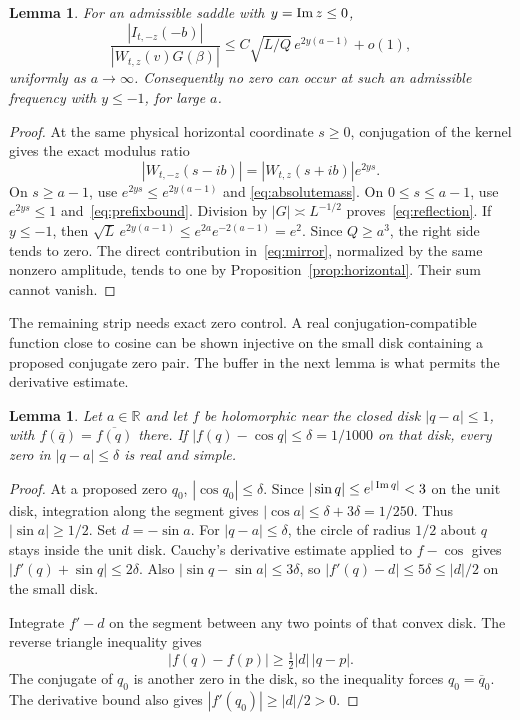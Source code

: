 \documentclass[11pt]{article}
\newtheorem{lemma}[theorem]{Lemma}
\theoremstyle{remark}\newtheorem{remark}[theorem]{Remark}
\newcommand{\R}{\mathbb R}\newcommand{\C}{\mathbb C}
\begin{document}
\begin{lemma}\label{lem:reflection}
For an admissible saddle with $y=\operatorname{Im} z\leq0$,
\begin{equation}\label{eq:reflection}
 \frac{|I_{t,-z}(-b)|}{|W_{t,z}(v)G(\beta)|}
 \leq C\sqrt{L/Q}\,e^{2y(a-1)}+o(1),
\end{equation}
uniformly as $a\to\infty$. Consequently no zero can occur
at such an admissible frequency with $y\leq-1$, for large $a$.
\end{lemma}
\begin{proof}
At the same physical horizontal coordinate $s\geq0$,
conjugation of the kernel gives the exact modulus ratio
\[
 |W_{t,-z}(s-ib)|=|W_{t,z}(s+ib)|e^{2ys}.
\]
On $s\geq a-1$, use $e^{2ys}\leq e^{2y(a-1)}$ and
\eqref{eq:absolutemass}. On $0\leq s\leq a-1$, use
$e^{2ys}\leq1$ and~\eqref{eq:prefixbound}. Division by
$|G|\asymp L^{-1/2}$ proves~\eqref{eq:reflection}.
If $y\leq-1$, then
$\sqrt L\,e^{2y(a-1)}\leq e^{2a}e^{-2(a-1)}=e^2$.
Since $Q\geq a^3$, the right side tends to zero. The direct
contribution in~\eqref{eq:mirror}, normalized by the same
nonzero amplitude, tends to one by
Proposition~\ref{prop:horizontal}. Their sum cannot vanish.
\end{proof}

The remaining strip needs exact zero control. A real
conjugation-compatible function close to cosine can be shown
injective on the small disk containing a proposed conjugate
zero pair. The buffer in the next lemma is what permits the
derivative estimate.

\begin{lemma}\label{lem:smallcosine}
Let $a\in\R$ and let $f$ be holomorphic near the closed disk
$|q-a|\leq1$, with $f(\overline q)=\overline{f(q)}$ there.
If $|f(q)-\cos q|\leq\delta=1/1000$ on that disk, every zero
in $|q-a|\leq\delta$ is real and simple.
\end{lemma}
\begin{proof}
At a proposed zero $q_0$, $|\cos q_0|\leq\delta$.
Since $|\sin q|\leq e^{|\operatorname{Im} q|}<3$ on the unit disk,
integration along the segment gives
$|\cos a|\leq\delta+3\delta=1/250$. Thus $|\sin a|\geq1/2$.
Set $d=-\sin a$. For $|q-a|\leq\delta$, the circle of
radius $1/2$ about $q$ stays inside the unit disk.
Cauchy's derivative estimate applied to $f-\cos$ gives
$|f'(q)+\sin q|\leq2\delta$.
Also $|\sin q-\sin a|\leq3\delta$, so
$|f'(q)-d|\leq5\delta\leq|d|/2$ on the small disk.

Integrate $f'-d$ on the segment between any two points of
that convex disk. The reverse triangle inequality gives
\[
 |f(q)-f(p)|\geq\tfrac12|d|\,|q-p|.
\]
The conjugate of $q_0$ is another zero in the disk, so the
inequality forces $q_0=\overline q_0$. The derivative bound
also gives $|f'(q_0)|\geq|d|/2>0$.
\end{proof}
\end{document}
